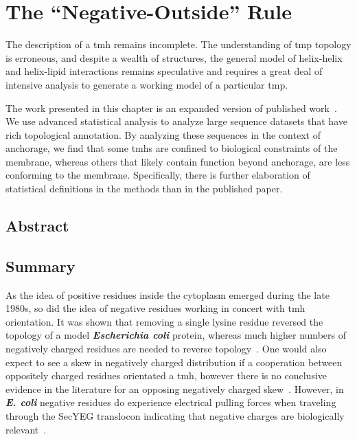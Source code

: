 
\chapter{The ``Negative-Outside'' Rule}

The description of a \gls{tmh} remains incomplete. The understanding of \gls{tmp} topology is erroneous, and despite a wealth of structures, the general model of helix-helix and helix-lipid interactions remains speculative and requires a great deal of intensive analysis to generate a working model of a particular \gls{tmp}.

The work presented in this chapter is an expanded version of published work~\cite{Baker2017}. We use advanced statistical analysis to analyze large sequence datasets that have rich topological annotation. By analyzing these sequences in the context of anchorage, we find that some \gls{tmh}s are confined to biological constraints of the membrane, whereas others that likely contain function beyond anchorage, are less conforming to the membrane. Specifically, there is further elaboration of statistical definitions in the methods than in the published paper.



\section{Abstract}

\section{Summary}
As the idea of positive residues inside the cytoplasm emerged during the late 1980s, so did the idea of negative residues working in concert with \gls{tmh} orientation. It was shown that removing a single lysine residue reversed the topology of a model \textbf{\textit{Escherichia coli}} protein, whereas much higher numbers of negatively charged residues are needed to reverse topology~\cite{Nilsson1990}. One would also expect to see a skew in negatively charged distribution if a cooperation between oppositely charged residues orientated a \gls{tmh}, however there is no conclusive evidence in the literature for an opposing negatively charged skew~\cite{Granseth2005, Nilsson2005, Sharpe2010, Baeza-Delgado2013, Pogozheva2013}. However, in \textbf{\textit{E. coli}} negative residues do experience electrical pulling forces when traveling through the SecYEG translocon indicating that negative charges are biologically relevant~\cite{Ismail2015}.
